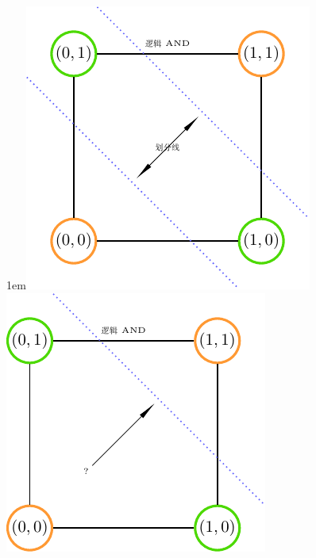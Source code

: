 \documentclass[12pt]{article}
\begin{document}
    \begin{figure}[!htb]
        \centering
        \leavevmode\lower1em\hbox{\includegraphics[scale=1]{picture/Classfication1.pdf}}
        \hspace*{4em}
        \includegraphics[scale=1]{picture/Classfication2.pdf}
    \end{figure}
\end{document}
